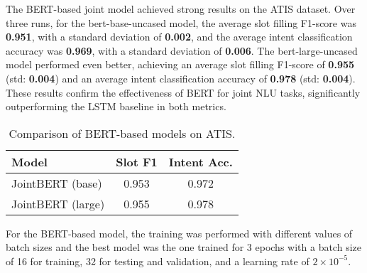 \documentclass[a4paper]{article}
\begin{document}
The BERT-based joint model achieved strong results on the ATIS dataset. Over three runs, for the bert-base-uncased model, the average slot filling F1-score was \textbf{ 0.951}, with a standard deviation of \textbf{0.002}, and the average intent classification accuracy
 was \textbf{0.969}, with a standard deviation of \textbf{0.006}. The bert-large-uncased model performed even better, achieving an average slot filling F1-score of \textbf{0.955} (std: \textbf{0.004}) and an average intent classification accuracy of \textbf{0.978} (std: \textbf{0.004}). 
These results confirm the effectiveness of BERT for joint NLU tasks, significantly outperforming the LSTM baseline in both metrics.

\begin{table}[h!]
  \centering
  \begin{tabular}{lcc}
    \toprule
    \textbf{Model} & \textbf{Slot F1} & \textbf{Intent Acc.} \\
    \midrule
    JointBERT (base) & 0.953 & 0.972 \\
    JointBERT (large)   & 0.955 & 0.978 \\
    \bottomrule
  \end{tabular}
  \caption{Comparison of BERT-based models on ATIS.}
  \label{tab:results}
\end{table}

For the BERT-based model, the training was performed with different values of 
batch sizes and the best model was the one trained for 3 epochs with
 a batch size of 16 for 
training, 32 for testing and validation, and a learning rate 
of $2 \times 10^{-5}$.




\end{document}
